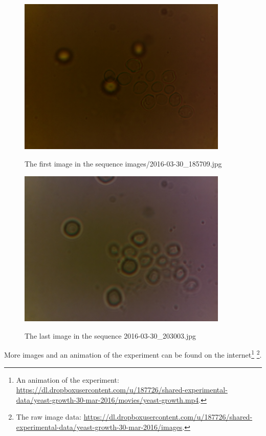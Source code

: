 \documentclass[12pt, a4paper]{article}
\begin{document}
\begin{figure}[th]
\begin{center}
\includegraphics[width=10cm]{images/2016-03-30_185709.jpg}
\label{firstimage}
\caption{The first image in the sequence images/2016-03-30\_185709.jpg}
\end{center}
\end{figure}


\begin{figure}[th]
\begin{center}
\includegraphics[width=10cm]{images/2016-03-30_203003.jpg}
\label{lastimage}
\caption{The last image in the sequence 2016-03-30\_203003.jpg}
\end{center}
\end{figure}


More images and an animation of the experiment can be found on the internet\footnote{An animation of the experiment: \url{https://dl.dropboxusercontent.com/u/187726/shared-experimental-data/yeast-growth-30-mar-2016/movies/yeast-growth.mp4}.}
\footnote{The raw image data: 
\url{https://dl.dropboxusercontent.com/u/187726/shared-experimental-data/yeast-growth-30-mar-2016/images}.}.
\end{document}
